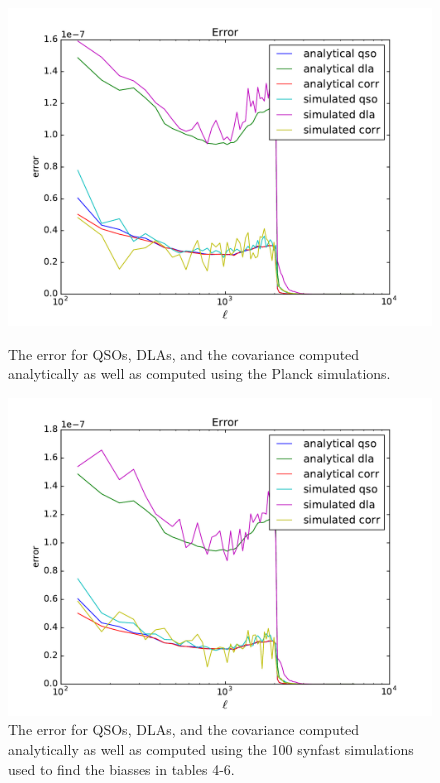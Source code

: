 \documentclass{amsart}
\begin{document}
\begin{figure}
  \includegraphics[width=\linewidth]{error_both_2.pdf}
  \caption{The error for QSOs, DLAs, and the covariance computed analytically as well as computed using the Planck simulations.}
  \label{fig:error}

  \includegraphics[width=\linewidth]{error_both_syn.pdf}
  \caption{The error for QSOs, DLAs, and the covariance computed analytically as well as computed using the 100 synfast simulations used to find the biasses in tables 4-6.}
  \label{fig:errorsyn}
\end{figure}
\end{document}

